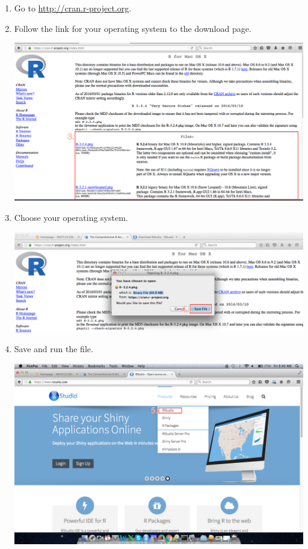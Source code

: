 \documentclass{article}
\begin{document}
\begin{enumerate}

\item Go to \url{http://cran.r-project.org}.

\item Follow the link for your operating system to the download page.

\vfill

\includegraphics[width=\textwidth-1.65cm]{RInstall2.png}

\item Choose your operating system.

\vfill

\newpage

\includegraphics[width=\textwidth-1.65cm]{RInstall3.png}

\item Save and run the file.

\vfill

\includegraphics[width=\textwidth-1.65cm]{RInstall4.png}


\end{enumerate}
\end{document}
